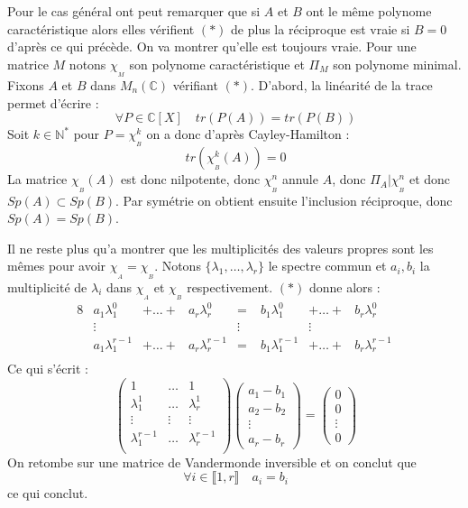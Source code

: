 \documentclass[letterpaper,10pt]{article}
\begin{document}
Pour le cas général ont peut remarquer que si $A$ et $B$ ont le même polynome
 caractéristique alors elles vérifient $(*)$ de plus la réciproque est vraie 
 si $B=0$ d'après ce qui précède. On va montrer qu'elle est toujours vraie. 
 Pour une matrice $M$ notons $\chi_{_M}$ son polynome caractéristique et $\Pi{_M}$ 
 son polynome minimal. Fixons $A$ et $B$ dans $M_n(\mathbb{C})$ vérifiant $(*) $.
  D'abord, la linéarité de la trace permet d'écrire : \[\ \forall P \in 
  \mathbb{C}\left[X\right] \quad tr(P(A)) = tr(P(B)) \] 
Soit $k \in \mathbb{N}^*$ pour  $P = \chi_{_B}^k$ on a donc 
d'après Cayley-Hamilton : \[\ tr(\chi_{_B}^k(A)) = 0 \] La matrice
 $\chi_{_B}(A)$ est donc nilpotente, donc $\chi_{_B}^n$ annule $A$, donc
  $\Pi_{A} | \chi_{_B}^n$ et donc $Sp(A) \subset Sp(B)$. Par symétrie on 
  obtient ensuite l'inclusion réciproque, donc $Sp(A) = Sp(B)$.

Il ne reste plus qu'a montrer que les multiplicités des valeurs propres sont les
 mêmes pour avoir $\chi_{_A} =\chi_{_B}$. Notons $\{\lambda_1,\ldots,\lambda_r\}$ 
 le spectre commun et $a_i, b_i$ la multiplicité de $\lambda_i$ dans $\chi_{_A}$ 
 et $\chi_{_B}$ respectivement. $(*)$ donne alors :
\begin{alignat*}{8}
 &a_1\lambda_1^0 &+ \ldots  +& a_r\lambda_r^0 &=&\; b_1\lambda_1^0 &+ \ldots  +& b_r\lambda_r^0 \\
&\vdots & & & \vdots & & \vdots &\\
 &a_1\lambda_1^{r-1} &+ \ldots  +& a_r\lambda_r^{r-1} &=&\; b_1\lambda_1^{r-1} &+ \ldots  +& b_r\lambda_r^{r-1} \\
\end{alignat*} Ce qui s'écrit :
\[\ \begin{pmatrix}
1  &\ldots & 1 \\
\lambda_1^1 & \ldots & \lambda_r^1 \\
\vdots & \vdots & \vdots \\
\lambda_1^{r-1} & \ldots & \lambda_r^{r-1} \\
\end{pmatrix}\begin{pmatrix}a_1-b_1 \\ a_2-b_2\\ \vdots \\ a_r-b_r
\end{pmatrix}
=\begin{pmatrix}0 \\ 0\\ \vdots \\ 0
\end{pmatrix}\] On retombe sur une matrice de Vandermonde inversible et on conclut que \[\ \forall i \in \llbracket 1,r \rrbracket \quad a_i= b_i \] ce qui conclut.
\end{document}
